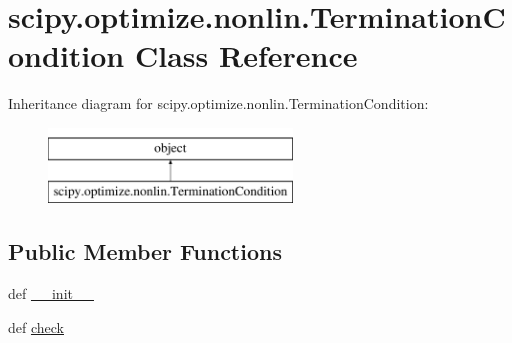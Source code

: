 \hypertarget{classscipy_1_1optimize_1_1nonlin_1_1TerminationCondition}{}\section{scipy.\+optimize.\+nonlin.\+Termination\+Condition Class Reference}
\label{classscipy_1_1optimize_1_1nonlin_1_1TerminationCondition}
Inheritance diagram for scipy.\+optimize.\+nonlin.\+Termination\+Condition\+:\begin{figure}[H]
\begin{center}
\leavevmode
\includegraphics[height=2.000000cm]{classscipy_1_1optimize_1_1nonlin_1_1TerminationCondition}
\end{center}
\end{figure}
\subsection*{Public Member Functions}
\begin{DoxyCompactItemize}
\item 
def \hyperlink{classscipy_1_1optimize_1_1nonlin_1_1TerminationCondition_a965056b946098c0d4b5515cc40b35792}{\+\_\+\+\_\+init\+\_\+\+\_\+}
\item 
def \hyperlink{classscipy_1_1optimize_1_1nonlin_1_1TerminationCondition_afa1be36beb11254c18180044763c10be}{check}
\end{DoxyCompactItemize}
